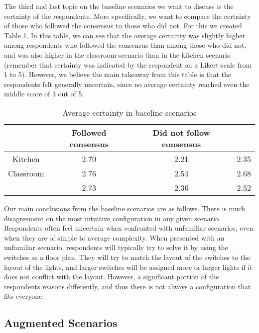 The third and last topic on the baseline scenarios we want to discuss is the certainty of the respondents. More specifically, we want to compare the certainty of those who followed the consensus to those who did not. For this we created Table \ref{table:preliminary_study_baseline_certainties}. In this table, we can see that the average certainty was slightly higher among respondents who followed the consensus than among those who did not, and was also higher in the classroom scenario than in the kitchen scenario (remember that certainty was indicated by the respondent on a Likert-scale from 1 to 5). However, we believe the main takeaway from this table is that the respondents felt generally uncertain, since no average certainty reached even the middle score of 3 out of 5.

\begin{table}
    \centering
    \begin{tabular}{|c|c c|c|} 
    \hline
              & Followed consensus & Did not follow consensus &      \\
    \hline
    Kitchen   &               2.70 &                     2.21 & 2.35 \\
    Classroom &               2.76 &                     2.54 & 2.68 \\
    \hline
              &               2.73 &                     2.36 & 2.52 \\
    \hline
\end{tabular}
\caption{Average certainty in baseline scenarios}
\label{table:preliminary_study_baseline_certainties}
\end{table}

Our main conclusions from the baseline scenarios are as follows. There is much disagreement on the most intuitive configuration in any given scenario. Respondents often feel uncertain when confronted with unfamiliar scenarios, even when they are of simple to average complexity. When presented with an unfamiliar scenario, respondents will typically try to solve it by using the switches as a floor plan. They will try to match the layout of the switches to the layout of the lights, and larger switches will be assigned more or larger lights if it does not conflict with the layout. However, a significant portion of the respondents reasons differently, and thus there is not always a configuration that fits everyone.

\subsection{Augmented Scenarios} \label{sec:preliminary_study:augmented_scenarios}

